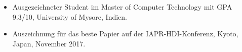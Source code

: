 \vspace{0.1cm}
\vspace{1em}

\begin{itemize}
    \item Ausgezeichneter Student im Master of Computer Technology mit GPA 9.3/10, University of Mysore, Indien.
    \item Auszeichnung für das beste Papier auf der IAPR-HDI-Konferenz, Kyoto, Japan, November 2017.
\end{itemize}